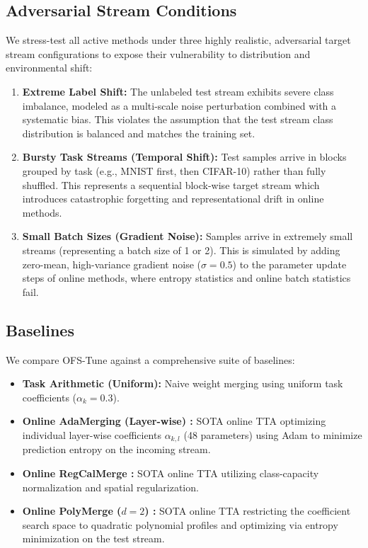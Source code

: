 \subsection{Adversarial Stream Conditions}
We stress-test all active methods under three highly realistic, adversarial target stream configurations to expose their vulnerability to distribution and environmental shift:
\begin{enumerate}
    \item \textbf{Extreme Label Shift:} The unlabeled test stream exhibits severe class imbalance, modeled as a multi-scale noise perturbation combined with a systematic bias. This violates the assumption that the test stream class distribution is balanced and matches the training set.
    \item \textbf{Bursty Task Streams (Temporal Shift):} Test samples arrive in blocks grouped by task (e.g., MNIST first, then CIFAR-10) rather than fully shuffled. This represents a sequential block-wise target stream which introduces catastrophic forgetting and representational drift in online methods.
    \item \textbf{Small Batch Sizes (Gradient Noise):} Samples arrive in extremely small streams (representing a batch size of 1 or 2). This is simulated by adding zero-mean, high-variance gradient noise ($\sigma = 0.5$) to the parameter update steps of online methods, where entropy statistics and online batch statistics fail.
\end{enumerate}

\subsection{Baselines}
We compare OFS-Tune against a comprehensive suite of baselines:
\begin{itemize}[leftmargin=*]
    \item \textbf{Task Arithmetic (Uniform):} Naive weight merging using uniform task coefficients ($\alpha_k = 0.3$).
    \item \textbf{Online AdaMerging (Layer-wise) \cite{adamerging}:} SOTA online TTA optimizing individual layer-wise coefficients $\alpha_{k, l}$ (48 parameters) using Adam to minimize prediction entropy on the incoming stream.
    \item \textbf{Online RegCalMerge \cite{regcalmerge}:} SOTA online TTA utilizing class-capacity normalization and spatial regularization.
    \item \textbf{Online PolyMerge ($d=2$) \cite{polymerge}:} SOTA online TTA restricting the coefficient search space to quadratic polynomial profiles and optimizing via entropy minimization on the test stream.
\end{itemize}

